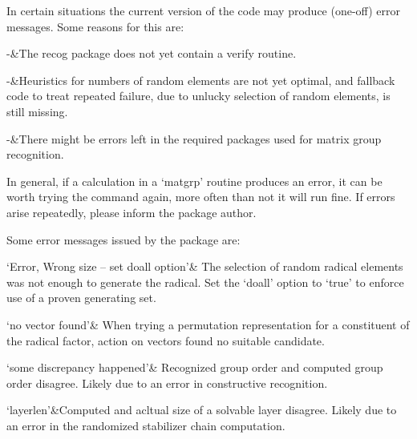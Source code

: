 In certain situations the current version of the code may produce (one-off)
error messages. Some reasons for this are:

\beginitems
-&The recog package does not yet contain a verify routine.

-&Heuristics for numbers of random elements are not yet optimal, and
  fallback code to treat repeated failure, due to unlucky selection of random
elements, is still missing.

-&There might be errors left in the required packages used for matrix group
  recognition.
\enditems

In general, if a calculation in a `matgrp' routine produces an error, it can
be worth trying the command again, more often than not it will run fine. If
errors arise repeatedly, please inform the package author.

Some error messages issued by the package are:

\beginitems
`Error, Wrong size -- set doall option'&
The selection of random radical elements was not enough to generate the
radical. Set the `doall' option to `true' to enforce use of a proven
generating set.

`no vector found'&
When trying a permutation representation for a constituent of the radical
factor, action on vectors found no suitable candidate.

`some discrepancy happened'&
Recognized group order and computed group order disagree. Likely due to an
error in constructive recognition.

`layerlen'&Computed and acltual size of a solvable layer disagree. Likely
due to an error in the randomized stabilizer chain computation.
\enditems

